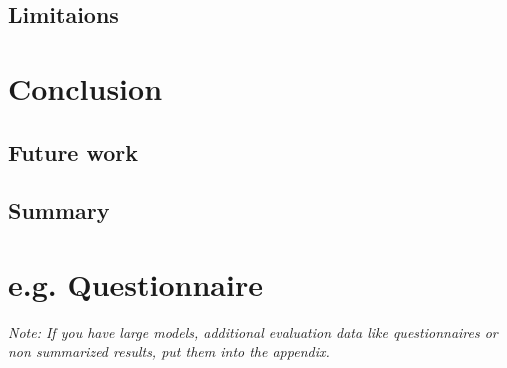 \documentclass[a4paper,12pt,twoside]{report}
\begin{document}
\section{Limitaions}






\chapter{Conclusion}
\section{Future work}
\section{Summary}






\appendix

\chapter{e.g. Questionnaire}

\textit{Note: If you have large models, additional evaluation data like questionnaires or non summarized results, put them into the appendix.}


\clearpage

\listoffigures
\clearpage

\listoftables
\clearpage



\end{document}
